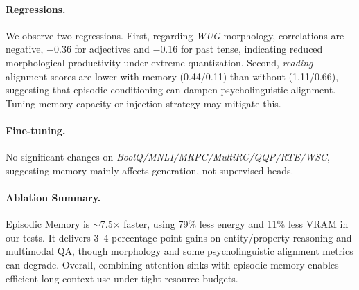 \paragraph{Regressions.}
We observe two regressions. First, regarding \textit{WUG} morphology, correlations are negative, $-$0.36 for adjectives and $-$0.16 for past tense, indicating reduced morphological productivity under extreme quantization. Second, \textit{reading} alignment scores are lower with memory (0.44/0.11) than without (1.11/0.66), suggesting that episodic conditioning can dampen psycholinguistic alignment. Tuning memory capacity or injection strategy may mitigate this.

\paragraph{Fine-tuning.}
No significant changes on \textit{BoolQ/MNLI/MRPC/MultiRC/QQP/RTE/WSC}, suggesting memory mainly affects generation, not supervised heads.

\paragraph{Ablation Summary.} Episodic Memory is $\sim$7.5$\times$ faster, using 79\% less energy and 11\% less VRAM in our tests. It delivers 3--4 percentage point gains on entity/property reasoning and multimodal QA, though morphology and some psycholinguistic alignment metrics can degrade. Overall, combining attention sinks with episodic memory enables efficient long-context use under tight resource budgets.
